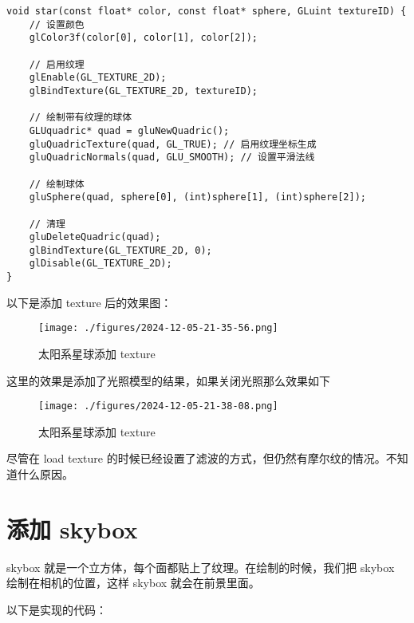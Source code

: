 \documentclass[12pt,hyperref,a4paper,UTF8]{ctexart}
\begin{document}
\begin{verbatim}
void star(const float* color, const float* sphere, GLuint textureID) {
    // 设置颜色
    glColor3f(color[0], color[1], color[2]);

    // 启用纹理
    glEnable(GL_TEXTURE_2D);
    glBindTexture(GL_TEXTURE_2D, textureID);

    // 绘制带有纹理的球体
    GLUquadric* quad = gluNewQuadric();
    gluQuadricTexture(quad, GL_TRUE); // 启用纹理坐标生成
    gluQuadricNormals(quad, GLU_SMOOTH); // 设置平滑法线

    // 绘制球体
    gluSphere(quad, sphere[0], (int)sphere[1], (int)sphere[2]);

    // 清理
    gluDeleteQuadric(quad);
    glBindTexture(GL_TEXTURE_2D, 0);
    glDisable(GL_TEXTURE_2D);
}
\end{verbatim}

以下是添加 texture 后的效果图：

\begin{figure}[H]
    \centering
    \texttt{[image: ./figures/2024-12-05-21-35-56.png]}
    \caption{太阳系星球添加 texture}
\end{figure}

这里的效果是添加了光照模型的结果，如果关闭光照那么效果如下

\begin{figure}[H]
    \centering
    \texttt{[image: ./figures/2024-12-05-21-38-08.png]}
    \caption{太阳系星球添加 texture}
\end{figure}

尽管在 load texture 的时候已经设置了滤波的方式，但仍然有摩尔纹的情况。不知道什么原因。

\section{添加 skybox}

skybox 就是一个立方体，每个面都贴上了纹理。在绘制的时候，我们把 skybox 绘制在相机的位置，这样 skybox 就会在前景里面。

以下是实现的代码：
\end{document}
